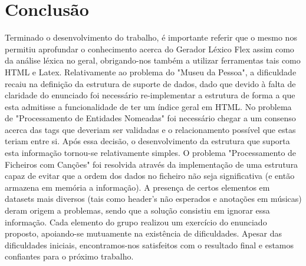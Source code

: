 \documentclass[a4paper,10pt]{report}
\begin{document}




\chapter{Conclusão}
\label{cap:intro}
Terminado o desenvolvimento do trabalho, é importante referir que o mesmo nos permitiu aprofundar o conhecimento acerca do Gerador Léxico Flex assim como da análise léxica no geral, obrigando-nos também a utilizar ferramentas tais como HTML e Latex.
Relativamente ao problema do "Museu da Pessoa", a dificuldade recaiu na definição da estrutura de suporte de dados, dado que devido à falta de claridade do enunciado foi necessário re-implementar a estrutura de forma a que esta admitisse a funcionalidade de ter um índice geral em HTML.
No problema de "Processamento de Entidades Nomeadas" foi necessário chegar a um consenso acerca das tags que deveriam ser validadas e o relacionamento possível que estas teriam entre si. Após essa decisão, o desenvolvimento da estrutura que suporta esta informação tornou-se relativamente simples.
O problema "Processamento de Ficheiros com Canções" foi resolvida através da implementação de uma estrutura capaz de evitar que a ordem dos dados no ficheiro não seja significativa (e então armazena em memória a informação). A presença de certos elementos em datasets mais diversos (tais como header's não esperados e anotações em músicas) deram origem a problemas, sendo que a solução consistiu em ignorar essa informação. 
Cada elemento do grupo realizou um exercício do enunciado proposto, apoiando-se mutuamente na existência de dificuldades. Apesar das dificuldades iniciais, encontramos-nos satisfeitos com o resultado final e estamos confiantes para o próximo trabalho.


\end{document}
